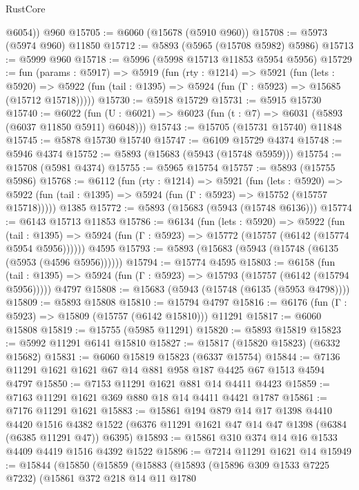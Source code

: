 \begin{lexlean}{RustCore}
\begin{coremodule}
        @6054))
    @960
@15705 := @6060 (@15678 (@5910 @960))
@15708 := @5973 (@5974 @960) @11850
@15712 := @5893 (@5965 (@15708 @5982) @5986)
@15713 := @5999 @960
@15718 := @5996 (@5998 @15713 @11853 @5954 @5956)
@15729 := fun (params : @5917) =>
  @5919
    (fun (rty : @1214) =>
    @5921
      (fun (lets : @5920) =>
      @5922 (fun (tail : @1395) => @5924 (fun (Γ : @5923) => @15685 (@15712 @15718)))))
@15730 := @5918 @15729
@15731 := @5915 @15730
@15740 := @6022
    (fun (U : @6021) => @6023 (fun (t : @7) => @6031 (@5893 (@6037 @11850 @5911) @6048)))
@15743 := @15705 (@15731 @15740) @11848
@15745 := @5878 @15730 @15740
@15747 := @6109 @15729 @4374
@15748 := @5946 @4374
@15752 := @5893 (@15683 (@5943 (@15748 @5959)))
@15754 := @15708 (@5981 @4374)
@15755 := @5965 @15754
@15757 := @5893 (@15755 @5986)
@15768 := @6112
    (fun (rty : @1214) =>
    @5921
      (fun (lets : @5920) =>
      @5922 (fun (tail : @1395) => @5924 (fun (Γ : @5923) => @15752 (@15757 @15718)))))
    @1385
@15772 := @5893 (@15683 (@5943 (@15748 @6136)))
@15774 := @6143 @15713 @11853
@15786 := @6134
    (fun (lets : @5920) =>
    @5922
      (fun (tail : @1395) =>
      @5924 (fun (Γ : @5923) => @15772 (@15757 (@6142 (@15774 @5954 @5956))))))
    @4595
@15793 := @5893 (@15683 (@5943 (@15748 (@6135 (@5953 (@4596 @5956))))))
@15794 := @15774 @4595
@15803 := @6158
    (fun (tail : @1395) => @5924 (fun (Γ : @5923) => @15793 (@15757 (@6142 (@15794 @5956)))))
    @4797
@15808 := @15683 (@5943 (@15748 (@6135 (@5953 @4798))))
@15809 := @5893 @15808
@15810 := @15794 @4797
@15816 := @6176 (fun (Γ : @5923) => @15809 (@15757 (@6142 @15810))) @11291
@15817 := @6060 @15808
@15819 := @15755 (@5985 @11291)
@15820 := @5893 @15819
@15823 := @5992 @11291 @6141 @15810
@15827 := @15817 (@15820 @15823) (@6332 @15682)
@15831 := @6060 @15819 @15823 (@6337 @15754)
@15844 := @7136 @11291 @1621 @1621 @67 @14 @881 @958 @187 @4425 @67 @1513 @4594 @4797
@15850 := @7153 @11291 @1621 @881 @14 @4411 @4423
@15859 := @7163 @11291 @1621 @369 @880 @18 @14 @4411 @4421 @1787
@15861 := @7176 @11291 @1621
@15883 := @15861
    @194
    @879
    @14
    @17
    @1398
    @4410
    @4420
    @1516
    @4382
    @1522
    (@6376 @11291 @1621 @47 @14 @47 @1398 (@6384 (@6385 @11291 @47)) @6395)
@15893 := @15861 @310 @374 @14 @16 @1533 @4409 @4419 @1516 @4392 @1522
@15896 := @7214 @11291 @1621 @14
@15949 := @15844
    (@15850
      (@15859
        (@15883
          (@15893
            (@15896 @309 @1533 @7225 @7232)
            (@15861
              @372
              @218
              @14
              @11
              @1780

\end{coremodule}
\end{lexlean}
